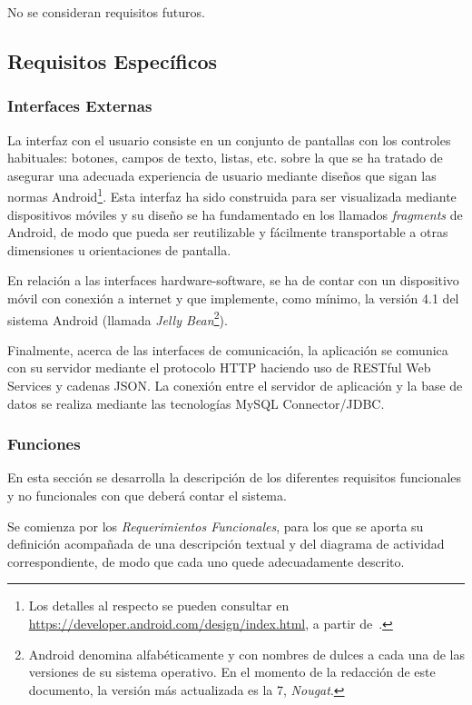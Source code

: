 No se consideran requisitos futuros.

\subsection{Requisitos Específicos}

\subsubsection{Interfaces Externas}

La interfaz con el usuario consiste en un conjunto de pantallas con los controles habituales: botones, campos de texto, listas, etc. sobre la que se ha tratado de asegurar una adecuada experiencia de usuario mediante diseños que sigan las normas Android\footnote{Los detalles al respecto se pueden consultar en \url{https://developer.android.com/design/index.html}, a partir de~\cite{AnDev}.}. Esta interfaz ha sido construida para ser visualizada mediante dispositivos móviles y su diseño se ha fundamentado en los llamados \emph{fragments} de Android, de modo que pueda ser reutilizable y fácilmente transportable a otras dimensiones u orientaciones de pantalla.

En relación a las interfaces hardware-software, se ha de contar con un dispositivo móvil con conexión a internet y que implemente, como mínimo, la versión 4.1 del sistema Android (llamada \emph{Jelly Bean}\footnote{Android denomina alfabéticamente y con nombres de dulces a cada una de las versiones de su sistema operativo. En el momento de la redacción de este documento, la versión más actualizada es la 7, \textit{Nougat}.}).

Finalmente, acerca de las interfaces de comunicación, la aplicación se comunica con su servidor mediante el protocolo HTTP haciendo uso de RESTful Web Services y cadenas JSON. La conexión entre el servidor de aplicación y la base de datos se realiza mediante las tecnologías MySQL Connector/JDBC.
\subsubsection{Funciones}

En esta sección se desarrolla la descripción de los diferentes requisitos funcionales y no funcionales con que deberá contar el sistema. 

Se comienza por los \emph{Requerimientos Funcionales}, para los que se aporta su definición acompañada de una descripción textual y del diagrama de actividad correspondiente, de modo que cada uno quede adecuadamente descrito.

